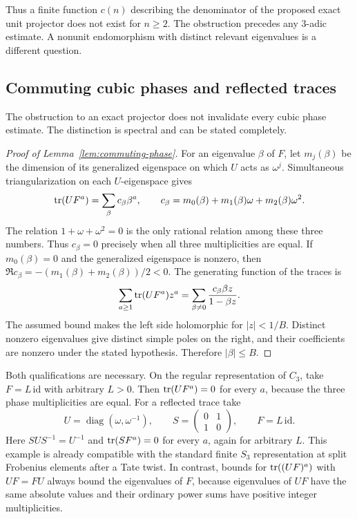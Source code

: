 \documentclass[11pt]{article}
\theoremstyle{remark}\newtheorem{remark}[theorem]{Remark}
\begin{document}
Thus a finite function $c(n)$ describing the denominator of the proposed exact unit projector does not exist for $n\ge2$. The obstruction precedes any 3-adic estimate. A nonunit endomorphism with distinct relevant eigenvalues is a different question.

\subsection{Commuting cubic phases and reflected traces}
The obstruction to an exact projector does not invalidate every cubic phase estimate. The distinction is spectral and can be stated completely.

\begin{proof}[Proof of Lemma~\ref{lem:commuting-phase}]
For an eigenvalue $\beta$ of $F$, let $m_j(\beta)$ be the dimension of its generalized eigenspace on which $U$ acts as $\omega^j$. Simultaneous triangularization on each $U$-eigenspace gives
\[
 \operatorname{tr}(UF^a)=\sum_\beta c_\beta\beta^a,
 \qquad c_\beta=m_0(\beta)+m_1(\beta)\omega+m_2(\beta)\omega^2.
\]
The relation $1+\omega+\omega^2=0$ is the only rational relation among these three numbers. Thus $c_\beta=0$ precisely when all three multiplicities are equal. If $m_0(\beta)=0$ and the generalized eigenspace is nonzero, then
$\Re c_\beta=-(m_1(\beta)+m_2(\beta))/2<0$.
The generating function of the traces is
\[
 \sum_{a\ge1}\operatorname{tr}(UF^a)z^a
 =\sum_{\beta\ne0}\frac{c_\beta\beta z}{1-\beta z}.
\]
The assumed bound makes the left side holomorphic for $|z|<1/B$. Distinct nonzero eigenvalues give distinct simple poles on the right, and their coefficients are nonzero under the stated hypothesis. Therefore $|\beta|\le B$.
\end{proof}

Both qualifications are necessary. On the regular representation of $C_3$, take $F=L\,\mathrm{id}$ with arbitrary $L>0$. Then $\operatorname{tr}(UF^a)=0$ for every $a$, because the three phase multiplicities are equal. For a reflected trace take
\[
 U=\operatorname{diag}(\omega,\omega^{-1}),\qquad
 S=\begin{pmatrix}0&1\\1&0\end{pmatrix},\qquad F=L\,\mathrm{id}.
\]
Here $SUS^{-1}=U^{-1}$ and $\operatorname{tr}(SF^a)=0$ for every $a$, again for arbitrary $L$. This example is already compatible with the standard finite $S_3$ representation at split Frobenius elements after a Tate twist. In contrast, bounds for $\operatorname{tr}((UF)^a)$ with $UF=FU$ always bound the eigenvalues of $F$, because eigenvalues of $UF$ have the same absolute values and their ordinary power sums have positive integer multiplicities.
\end{document}
